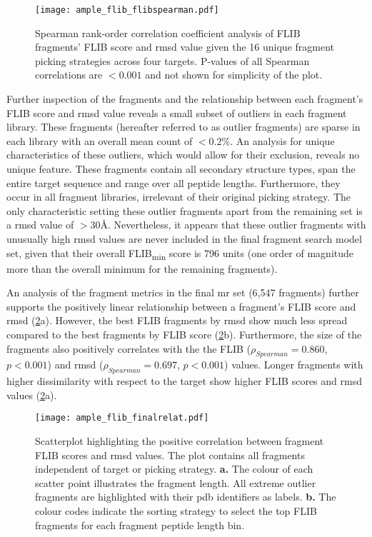 \begin{figure}[H]
	\centering
	\texttt{[image: ample\_flib\_flibspearman.pdf]}
        \caption[Spearman rank-order correlation coefficient analysis of FLIB fragments]{Spearman rank-order correlation coefficient analysis of FLIB fragments' FLIB score and \gls{rmsd} value given the 16 unique fragment picking strategies across four targets. P-values of all Spearman correlations are $<0.001$ and not shown for simplicity of the plot.}
	\label{fig:ample_flib_flibspearman}
\end{figure}

Further inspection of the fragments and the relationship between each fragment's FLIB score and \gls{rmsd} value reveals a small subset of outliers in each fragment library. These fragments (hereafter referred to as outlier fragments) are sparse in each library with an overall mean count of $<0.2$\%. An analysis for unique characteristics of these outliers, which would allow for their exclusion, reveals no unique feature. These fragments contain all secondary structure types, span the entire target sequence and range over all peptide lengths. Furthermore, they occur in all fragment libraries, irrelevant of their original picking strategy. The only characteristic setting these outlier fragments apart from the remaining set is a \gls{rmsd} value of $>30$\AA. Nevertheless, it appears that these outlier fragments with unusually high \gls{rmsd} values are never included in the final fragment search model set, given that their overall FLIB\textsubscript{min} score is 796 units (one order of magnitude more than the overall minimum for the remaining fragments).

An analysis of the fragment metrics in the final \gls{mr} set (6,547 fragments) further supports the positively linear relationship between a fragment's FLIB score and \gls{rmsd} (\cref{fig:ample_flib_finalrelat}a). However, the best FLIB fragments by \gls{rmsd} show much less spread compared to the best fragments by FLIB score (\cref{fig:ample_flib_finalrelat}b). Furthermore, the size of the fragments also positively correlates with the the FLIB ($\rho_{Spearman}=0.860$, $p<0.001$) and \gls{rmsd} ($\rho_{Spearman}=0.697$, $p<0.001$) values. Longer fragments with higher dissimilarity with respect to the target show higher FLIB scores and \gls{rmsd} values (\cref{fig:ample_flib_finalrelat}a). 

\begin{figure}[H]
	\centering
	\texttt{[image: ample\_flib\_finalrelat.pdf]}
        \caption[Correlation analysis for final FLIB \gls{mr} fragments]{Scatterplot highlighting the positive correlation between fragment FLIB scores and \gls{rmsd} values. The plot contains all fragments independent of target or picking strategy. \textbf{a.} The colour of each scatter point illustrates the fragment length. All extreme outlier fragments are highlighted with their \gls{pdb} identifiers as labels. \textbf{b.} The colour codes indicate the sorting strategy to select the top FLIB fragments for each fragment peptide length bin.}
	\label{fig:ample_flib_finalrelat}
\end{figure}

